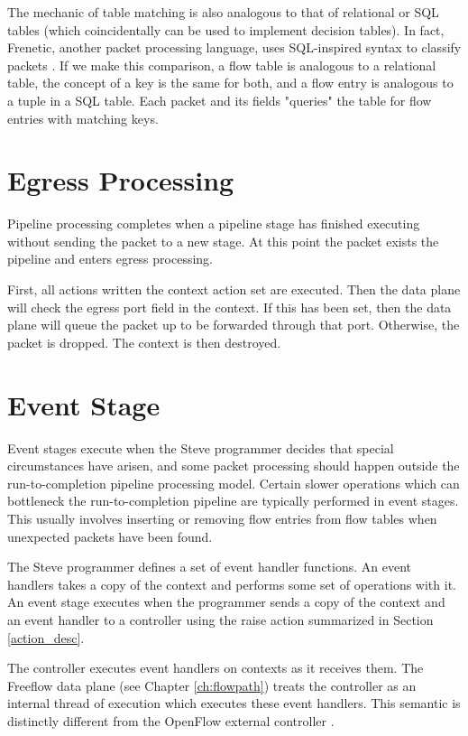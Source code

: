 The mechanic of table matching is also analogous to that of relational or SQL
tables (which coincidentally can be used to implement decision tables). In fact,
Frenetic, another packet processing language, uses SQL-inspired syntax to
classify packets \cite{foster2011frenetic, foster2013frenetic}. If we make this
comparison, a flow table is analogous to a relational table, the concept of a
key is the same for both, and a flow entry is analogous to a tuple in a SQL
table. Each packet and its fields "queries" the table for flow entries with
matching keys.

\section{Egress Processing} \label{egress_desc}

Pipeline processing completes when a pipeline stage has finished executing
without sending the packet to a new stage. At this point the packet exists the
pipeline and enters egress processing.

First, all actions written the context action set are executed. Then the data
plane will check the egress port field in the context. If this has been set,
then the data plane will queue the packet up to be forwarded through that port.
Otherwise, the packet is dropped. The context is then destroyed.

\section{Event Stage} \label{events_desc}

Event stages execute when the Steve programmer decides that special
circumstances have arisen, and some packet processing should happen outside the
run-to-completion pipeline processing model. Certain slower operations which can
bottleneck the run-to-completion pipeline are typically performed in event
stages. This usually involves inserting or removing flow entries from flow
tables when unexpected packets have been found.

The Steve programmer defines a set of event handler functions. An event handlers
takes a copy of the context and performs some set of operations with it. An
event stage executes when the programmer sends a copy of the context and an
event handler to a controller using the raise action summarized in Section
\ref{action_desc}.

The controller executes event handlers on contexts as it receives them. The
Freeflow data plane (see Chapter \ref{ch:flowpath}) treats the controller as an
internal thread of execution which executes these event handlers. This semantic
is distinctly different from the OpenFlow external controller
\cite{openflow_spec}.


